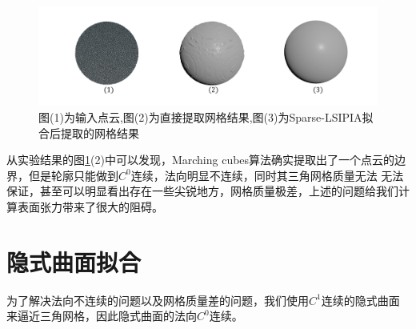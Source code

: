 \begin{figure}[htbp]
    \centering
    \includegraphics[scale=0.5]{./images/experience1.png}
    \caption[提取网格对比]{图(1)为输入点云,图(2)为直接提取网格结果,图(3)为Sparse-LSIPIA拟合后提取的网格结果}
    \label{fig: MarchingCube vs after Sparse-LSIPIA}
\end{figure}


从实验结果的图\ref{fig: MarchingCube vs after Sparse-LSIPIA}(2)中可以发现，Marching cubes算法确实提取出了一个点云的边界，但是轮廓只能做到$C^0$连续，法向明显不连续，同时其三角网格质量无法
无法保证，甚至可以明显看出存在一些尖锐地方，网格质量极差，上述的问题给我们计算表面张力带来了很大的阻碍。

\section{隐式曲面拟合}
为了解决法向不连续的问题以及网格质量差的问题，我们使用$C^1$连续的隐式曲面来逼近三角网格，因此隐式曲面的法向$C^0$连续。

